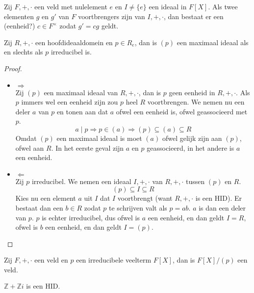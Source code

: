 \documentclass[main.tex]{subfiles}
\begin{document}
\begin{st}
  Zij $F,+,\cdot$ een veld met nulelement $e$ en $I \neq \{e\}$ een ideaal in $F[X]$.
  Als twee elementen $g$ en $g'$ van $F$ voortbrengers zijn van $I,+,\cdot$, dan bestaat er een (eenheid?) $c\in F^{\times}$ zodat $g'=cg$ geldt.
\end{st}

\begin{st}
  Zij $R,+,\cdot$ een hoofdideaaldomein en $p\in R_{e}$, dan is $(p)$ een maximaal ideaal als en slechts als $p$ irreducibel is.

  \begin{proof}
    \begin{itemize}
    \item $\Rightarrow$\\
      Zij $(p)$ een maximaal ideaal van $R,+,\cdot$, dan is $p$ geen eenheid in $R,+,\cdot$.
      Als $p$ immers wel een eenheid zijn zou $p$ heel $R$ voortbrengen. \waarom
      We nemen nu een deler $a$ van $p$ en tonen aan dat $a$ ofwel een eenheid is, ofwel geassocieerd met $p$.
      \[ a \mid p \Rightarrow p \in (a) \Rightarrow (p) \subseteq (a) \subseteq R \]
      \waarom
      Omdat $(p)$ een maximaal ideaal is moet $(a)$ ofwel gelijk zijn aan $(p)$, ofwel aan $R$.
      In het eerste geval zijn $a$ en $p$ geassocieerd, in het andere is $a$ een eenheid.\waarom
    \item $\Leftarrow$\\
      Zij $p$ irreducibel.
      We nemen een ideaal $I,+,\cdot$ van $R,+,\cdot$ tussen $(p)$ en $R$.
      \[ (p) \subseteq I \subseteq R \]
      Kies nu een element $a$ uit $I$ dat $I$ voortbrengt (want $R,+,\cdot$ is een HID).
      Er bestaat dan een $b\in R$ zodat $p$ te schrijven valt als $p=ab$.
      $a$ is dan een deler van $p$.
      $p$ is echter irreducibel, dus ofwel is $a$ een eenheid, en dan geldt $I=R$, ofwel is $b$ een eenheid, en dan geldt $I=(p)$.
    \end{itemize}
  \end{proof}
\end{st}

\begin{gev}
  Zij $F,+,\cdot$ een veld en $p$ een irreducibele veelterm $F[X]$, dan is $F[X]/(p)$ een veld.
\end{gev}

\begin{st}
  $\mathbb{Z} + \mathbb{Z}i$ is een HID.
  \zb
\end{st}
\end{document}
